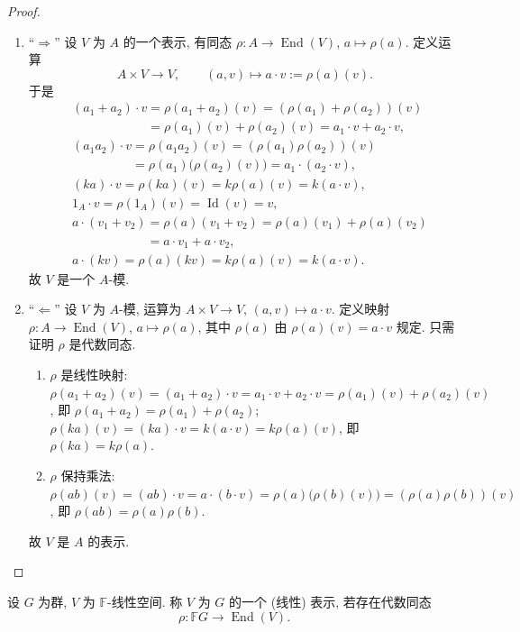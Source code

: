 \begin{proof}
\mbox{}\par\vspace{-0.2em}
\begin{enumerate}
\item ``$\Longrightarrow$'' 设 $V$ 为 $A$ 的一个表示, 有同态 $\rho\colon A\to\operatorname{End}(V)$, $a\mapsto\rho(a)$.
定义运算
\[
  A\times V\longrightarrow V,\qquad (a,v)\longmapsto a\cdot v:=\rho(a)(v).
\]
于是
\[\begin{aligned}
  &(a_1+a_2)\cdot v=\rho(a_1+a_2)(v)=(\rho(a_1)+\rho(a_2))(v)\\
  &\phantom{(a_1+a_2)\cdot v}=\rho(a_1)(v)+\rho(a_2)(v)=a_1\cdot v+a_2\cdot v,\\
  &(a_1a_2)\cdot v=\rho(a_1a_2)(v)=(\rho(a_1)\rho(a_2))(v)\\
  &\phantom{(a_1a_2)\cdot v}=\rho(a_1)\bigl(\rho(a_2)(v)\bigr)=a_1\cdot(a_2\cdot v),\\
  &(ka)\cdot v=\rho(ka)(v)=k\rho(a)(v)=k(a\cdot v),\\
  &1_A\cdot v=\rho(1_A)(v)=\operatorname{Id}(v)=v,\\
  &a\cdot(v_1+v_2)=\rho(a)(v_1+v_2)=\rho(a)(v_1)+\rho(a)(v_2)\\
  &\phantom{a\cdot(v_1+v_2)}=a\cdot v_1+a\cdot v_2,\\
  &a\cdot(kv)=\rho(a)(kv)=k\rho(a)(v)=k(a\cdot v).
\end{aligned}\]
故 $V$ 是一个 $A$-模.

\item ``$\Longleftarrow$'' 设 $V$ 为 $A$-模, 运算为 $A\times V\to V$, $(a,v)\mapsto a\cdot v$.
定义映射 $\rho\colon A\to\operatorname{End}(V)$, $a\mapsto\rho(a)$, 其中 $\rho(a)$ 由 $\rho(a)(v)=a\cdot v$ 规定.
只需证明 $\rho$ 是代数同态.
\begin{enumerate}
  \item $\rho$ 是线性映射:
  $\rho(a_1+a_2)(v)=(a_1+a_2)\cdot v=a_1\cdot v+a_2\cdot v=\rho(a_1)(v)+\rho(a_2)(v)$,
  即 $\rho(a_1+a_2)=\rho(a_1)+\rho(a_2)$;
  $\rho(ka)(v)=(ka)\cdot v=k(a\cdot v)=k\rho(a)(v)$, 即 $\rho(ka)=k\rho(a)$.
  \item $\rho$ 保持乘法:
  $\rho(ab)(v)=(ab)\cdot v=a\cdot(b\cdot v)=\rho(a)\bigl(\rho(b)(v)\bigr)=(\rho(a)\rho(b))(v)$,
  即 $\rho(ab)=\rho(a)\rho(b)$.
\end{enumerate}
故 $V$ 是 $A$ 的表示.
\end{enumerate}
\end{proof}

\begin{definition}[群的表示]\label{def:group-representation}
设 $G$ 为群, $V$ 为 $\mathbb{F}$-线性空间. 称 $V$ 为 $G$ 的一个 (线性) 表示, 若存在代数同态
\[
  \rho\colon \mathbb{F}G\longrightarrow\operatorname{End}(V).
\]
\end{definition}

